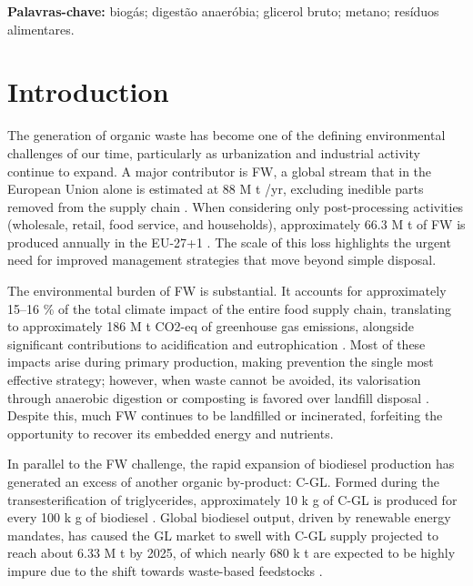 \documentclass[12pt, a4paper, oneside]{report}
\begin{document}
\vspace{1em}
\noindent\textbf{Palavras-chave:} biogás; digestão anaeróbia; glicerol bruto; metano; resíduos alimentares.
\clearpage{}
\endgroup

\setcounter{page}{1}

\glsresetall

\clearpage{}\chapter{Introduction}

The generation of organic waste has become one of the defining environmental challenges of our time, particularly as urbanization and industrial activity continue to expand. A major contributor is FW, a global stream that in the European Union alone is estimated at 88 M t /yr, excluding inedible parts removed from the supply chain \parencite{scherhaufer2018}. When considering only post-processing activities (wholesale, retail, food service, and households), approximately 66.3 M t of FW is produced annually in the EU-27+1 \parencite{albizzati2021}. The scale of this loss highlights the urgent need for improved management strategies that move beyond simple disposal.

The environmental burden of FW is substantial. It accounts for approximately 15–16 \% of the total climate impact of the entire food supply chain, translating to approximately 186 M t CO2-eq of greenhouse gas emissions, alongside significant contributions to acidification and eutrophication \parencite{scherhaufer2018}. Most of these impacts arise during primary production, making prevention the single most effective strategy; however, when waste cannot be avoided, its valorisation through anaerobic digestion or composting is favored over landfill disposal \parencite{albizzati2021, scherhaufer2018}. Despite this, much FW continues to be landfilled or incinerated, forfeiting the opportunity to recover its embedded energy and nutrients.

In parallel to the FW challenge, the rapid expansion of biodiesel production has generated an excess of another organic by-product: C-GL. Formed during the transesterification of triglycerides, approximately 10 k g of C-GL is produced for every 100 k g of biodiesel \parencite{garlapati2016}. Global biodiesel output, driven by renewable energy mandates, has caused the GL market to swell with C-GL supply projected to reach about 6.33 M t by 2025, of which nearly 680 k t are expected to be highly impure due to the shift towards waste-based feedstocks \parencite{attarbachi2023}.
\end{document}
